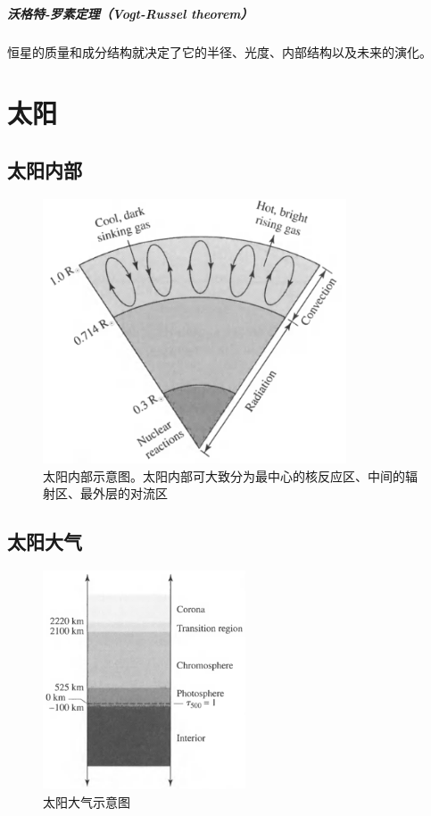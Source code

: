 \documentclass[openany]{ctexbook}
\begin{document}
\paragraph{沃格特-罗素定理（Vogt-Russel theorem）}
恒星的质量和成分结构就决定了它的半径、光度、内部结构以及未来的演化。

\chapter{太阳}
\section{太阳内部}
\begin{figure}[hbt]
  \centering
  \includegraphics[width=9cm]{chapters/11/interior}
  \caption{太阳内部示意图。太阳内部可大致分为最中心的核反应区、中间的辐射区、最外层的对流区}
  \label{}
\end{figure}

\section{太阳大气}
\begin{figure}[hbt]
  \centering
  \includegraphics[width=6cm]{chapters/11/atmosphere}
  \caption{太阳大气示意图}
  \label{}
\end{figure}
\end{document}
